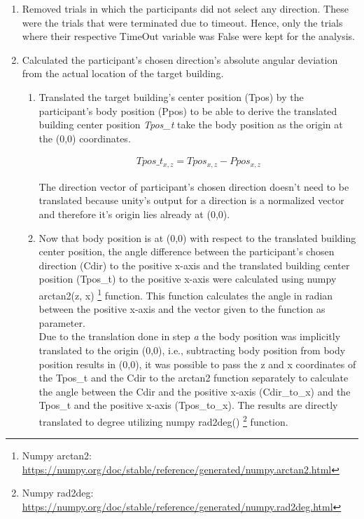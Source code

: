 \begin{enumerate}
	\item Removed trials in which the participants did not select any direction. These were the trials that were terminated due to timeout. Hence, only the trials where their respective TimeOut variable was False were kept for the analysis. \\
	
	\item Calculated the participant's chosen direction's absolute angular deviation from the actual location of the target building.
	
	\begin{enumerate}
		\item Translated the target building's center position {\emphasize(Tpos)} by the participant's body position {\emphasize(Ppos)} to be able to derive the translated building center position {\emph{Tpos\_t}} take the body position as the origin at the (0,0) coordinates.
		
			\begin{align*}
				Tpos\_t_{x,z}= Tpos_{x,z} - Ppos_{x,z}
			\end{align*}
		
		The direction vector of participant's chosen direction doesn't need to be translated because unity's output for a direction is a normalized vector and therefore it's origin lies already at (0,0).\\
		
		\item Now that body position is at (0,0) with respect to the translated building center position, the angle difference between the participant's chosen direction {\emphasize(Cdir)} to the positive x-axis and the translated building center position {\emphasize(Tpos\_t)} to the positive x-axis were calculated using numpy arctan2(z, x) \footnote{Numpy arctan2: \href{https://numpy.org/doc/stable/reference/generated/numpy.arctan2.html}{https://numpy.org/doc/stable/reference/generated/numpy.arctan2.html}} function. This function calculates the angle in radian between the positive x-axis and the vector given to the function as parameter. \\
		Due to the translation done in step \emph{a} the body position was implicitly translated to the origin (0,0), i.e., subtracting body position from body position results in (0,0), it was possible to pass the z and x coordinates of the {\emphasize Tpos\_t} and the {\emphasize Cdir} to the arctan2 function separately to calculate the angle between the {\emphasize Cdir} and the positive x-axis {\emphasize (Cdir\_to\_x)} and the {\emphasize Tpos\_t} and the positive x-axis {\emphasize (Tpos\_to\_x)}. The results are directly translated to degree utilizing numpy rad2deg() \footnote{Numpy rad2deg: \href{https://numpy.org/doc/stable/reference/generated/numpy.rad2deg.html}{https://numpy.org/doc/stable/reference/generated/numpy.rad2deg.html}} function.
	

\end{enumerate}
\end{enumerate}
